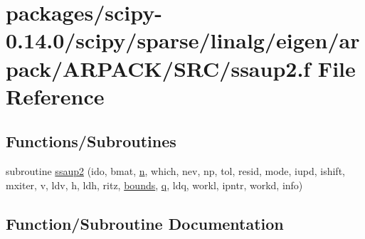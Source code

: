 \hypertarget{ssaup2_8f}{}\section{packages/scipy-\/0.14.0/scipy/sparse/linalg/eigen/arpack/\+A\+R\+P\+A\+C\+K/\+S\+R\+C/ssaup2.f File Reference}
\label{ssaup2_8f}
\subsection*{Functions/\+Subroutines}
\begin{DoxyCompactItemize}
\item 
subroutine \hyperlink{ssaup2_8f_ad9d1af273ee9af61073364ad2ab19909}{ssaup2} (ido, bmat, \hyperlink{indexexpr_8h_ab427e2e2b4d6cec55fa088ea2a692ace}{n}, which, nev, np, tol, resid, mode, iupd, ishift, mxiter, v, ldv, h, ldh, ritz, \hyperlink{structbounds}{bounds}, \hyperlink{indexexpr_8h_ac886c3584e464b5533390d7440c9dd98}{q}, ldq, workl, ipntr, workd, info)
\end{DoxyCompactItemize}


\subsection{Function/\+Subroutine Documentation}
\hypertarget{ssaup2_8f_ad9d1af273ee9af61073364ad2ab19909}{}
